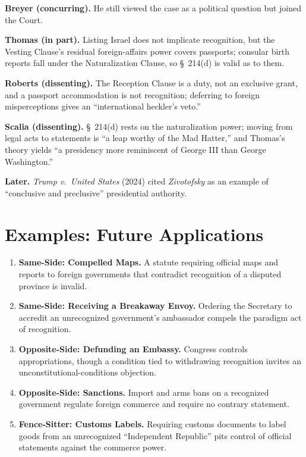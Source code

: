 \documentclass[12pt]{article}
\begin{document}
\textbf{Breyer (concurring).} He still viewed the case as a political question but joined the Court.

\textbf{Thomas (in part).} Listing Israel does not implicate recognition, but the Vesting Clause's residual foreign-affairs power covers passports; consular birth reports fall under the Naturalization Clause, so \S~214(d) is valid as to them.

\textbf{Roberts (dissenting).} The Reception Clause is a duty, not an exclusive grant, and a passport accommodation is not recognition; deferring to foreign misperceptions gives an ``international heckler's veto.''

\textbf{Scalia (dissenting).} \S~214(d) rests on the naturalization power; moving from legal acts to statements is ``a leap worthy of the Mad Hatter,'' and Thomas's theory yields ``a presidency more reminiscent of George III than George Washington.''

\textbf{Later.} \textit{Trump v.\ United States} (2024) cited \textit{Zivotofsky} as an example of ``conclusive and preclusive'' presidential authority.

\section{Examples: Future Applications}

\begin{enumerate}
\item \textbf{Same-Side: Compelled Maps.} A statute requiring official maps and reports to foreign governments that contradict recognition of a disputed province is invalid.
\item \textbf{Same-Side: Receiving a Breakaway Envoy.} Ordering the Secretary to accredit an unrecognized government's ambassador compels the paradigm act of recognition.
\item \textbf{Opposite-Side: Defunding an Embassy.} Congress controls appropriations, though a condition tied to withdrawing recognition invites an unconstitutional-conditions objection.
\item \textbf{Opposite-Side: Sanctions.} Import and arms bans on a recognized government regulate foreign commerce and require no contrary statement.
\item \textbf{Fence-Sitter: Customs Labels.} Requiring customs documents to label goods from an unrecognized ``Independent Republic'' pits control of official statements against the commerce power.
\end{enumerate}
\end{document}

